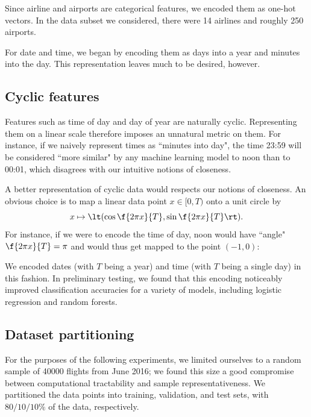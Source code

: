 \documentclass{article}
\begin{document}
\begin{multicols}{2}
Since airline and airports are categorical features,
we encoded them as one-hot vectors.
In the data subset we considered,
there were 14 airlines and roughly 250 airports.

For date and time,
we began by encoding them as days into a year
and minutes into the day.
This representation leaves much to be desired, however.


\subsection{Cyclic features}

Features such as time of day and day of year
are naturally cyclic.
Representing them on a linear scale
therefore imposes an unnatural metric on them.
For instance,
if we naively represent times as ``minutes into day",
the time 23:59 will be considered ``more similar"
by any machine learning model to noon than to 00:01,
which disagrees with our intuitive notions of closeness.

A better representation of cyclic data
would respects our notions of closeness.
An obvious choice is to map a linear data point $x \in [0, T)$
onto a unit circle by
\begin{equation}
    \label{eq:cyc-mapping}
    x \mapsto \lt(\cos\f{2\pi x}{T}, \sin\f{2\pi x}{T}\rt).
\end{equation}
For instance, if we were to encode the time of day,
noon would have ``angle" $\f{2\pi x}{T} = \pi$
and would thus get mapped to the point $(-1, 0)$:

\begin{center}
    
\end{center}

We encoded dates (with $T$ being a year)
and time (with $T$ being a single day)
in this fashion.
In preliminary testing,
we found that this encoding
noticeably improved classification accuracies
for a variety of models,
including logistic regression and random forests.

\subsection{Dataset partitioning}

For the purposes of the following experiments,
we limited ourselves to a random sample of 40000 flights
from June 2016;
we found this size a good compromise between computational tractability
and sample representativeness.
We partitioned the data points into training, validation, and test sets,
with $80/10/10\%$ of the data, respectively.


\end{multicols}
\end{document}
